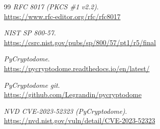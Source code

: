 \documentclass[12pt,a4paper]{article}
\begin{document}
\begin{thebibliography}{99}
    \textit{RFC 8017 (PKCS \#1 v2.2)}.
    \\
    \url{https://www.rfc-editor.org/rfc/rfc8017}

    \textit{NIST SP 800-57}.
    \\
    \url{https://csrc.nist.gov/pubs/sp/800/57/pt1/r5/final}

    \textit{PyCryptodome}.
    \\
    \url{https://pycryptodome.readthedocs.io/en/latest/}

    \textit{PyCryptodome git}.
    \\
    \url{https://github.com/Legrandin/pycryptodome}

    \textit{NVD CVE-2023-52323 (PyCryptodome)}.
    \\
    \url{https://nvd.nist.gov/vuln/detail/CVE-2023-52323}

\end{thebibliography}
\end{document}
